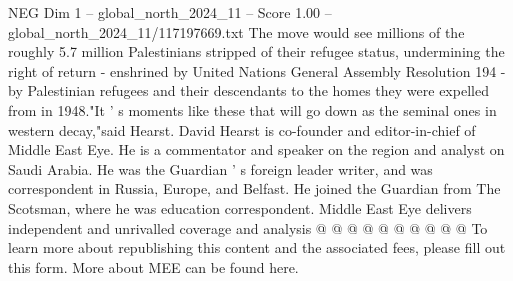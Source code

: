 \begin{textsample}{NEG Dim 1 – global\_north\_2024\_11 – Score 1.00 – global\_north\_2024\_11/117197669.txt}
The move would see millions of the roughly 5.7 million Palestinians stripped of their refugee status, undermining the right of return - enshrined by United Nations General Assembly Resolution 194 - by Palestinian refugees and their descendants to the homes they were expelled from in 1948."It ' s moments like these that will go down as the seminal ones in western decay,"said Hearst.
David Hearst is co-founder and editor-in-chief of Middle East Eye.
He is a commentator and speaker on the region and analyst on Saudi Arabia.
He was the Guardian ' s foreign leader writer, and was correspondent in Russia, Europe, and Belfast.
He joined the Guardian from The Scotsman, where he was education correspondent.
Middle East Eye delivers independent and unrivalled coverage and analysis @ @ @ @ @ @ @ @ @ @ To learn more about republishing this content and the associated fees, please fill out this form.
More about MEE can be found here.

\end{textsample}
